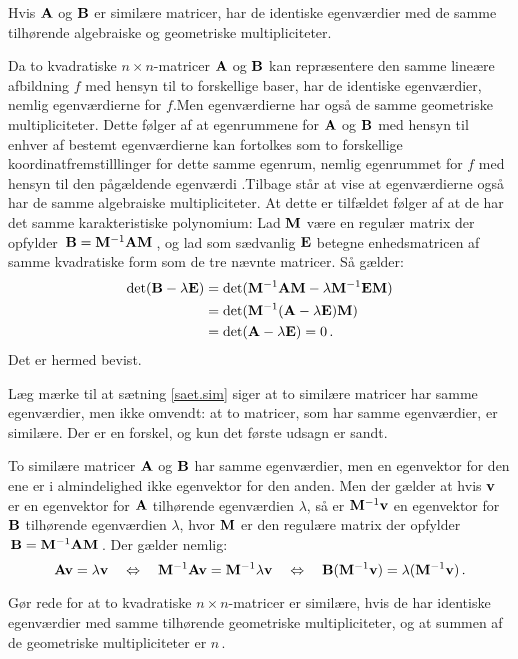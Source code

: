 \begin{theorem} \label{saet.sim}
Hvis $ \mathbf{A} $ og $ \mathbf{B} $ er similære matricer, har de identiske egenværdier med de samme tilhørende algebraiske og geometriske multipliciteter.
\end{theorem}
\begin{bevis}
Da to kvadratiske $n\times n$-matricer $\mathbf{A}$ og $\mathbf{B}$ kan repræsentere den samme lineære afbildning $f$ med hensyn til to forskellige baser, har de identiske egenværdier, nemlig egenværdierne for $f$.\bs Men egenværdierne har også de samme geometriske multipliciteter. Dette følger af at egenrummene for $\mathbf{A}$ og $\mathbf{B}$ med hensyn til enhver af bestemt egenværdierne kan fortolkes som to forskellige koordinatfremstilllinger for dette samme egenrum, nemlig egenrummet for $f$ med hensyn til den pågældende egenværdi .\bs Tilbage står at vise at egenværdierne også har de samme algebraiske multipliciteter. At dette er tilfældet følger af at de har det samme karakteristiske polynomium: Lad $\mathbf{M}$ være en regulær matrix der opfylder $\,\mathbf{B} = \mathbf{M}^{-1} \mathbf{A} \mathbf{M}\,$, og lad som sædvanlig $\mathbf{E}$ betegne enhedsmatricen af samme kvadratiske form som de tre nævnte matricer. Så gælder:
\begin{equation}
\begin{aligned}
\det(\mathbf{B} - \lambda\mathbf{E}) &= \det(\mathbf{M}^{-1} \mathbf{A} \mathbf{M} - \lambda \mathbf{M}^{-1} \mathbf{E} \mathbf{M}) \\
&= \det(\mathbf{M}^{-1}(\mathbf{A} - \lambda\mathbf{E})\mathbf{M}) \\
&= \det(\mathbf{A} - \lambda\mathbf{E}) = 0\,.
\end{aligned}
\end{equation}
Det er hermed bevist.
\end{bevis}

\begin{obs}
Læg mærke til at sætning \ref{saet.sim} siger at to similære matricer har samme egenværdier, men ikke omvendt: at to matricer, som har samme egenværdier, er similære. Der er en forskel, og kun det første udsagn er sandt.
\end{obs}

\begin{obs}
To similære matricer $ \mathbf{A} $ og $ \mathbf{B} $ har samme egenværdier, men en egenvektor for den ene er i almindelighed ikke egenvektor for den anden. Men der gælder at hvis $ \mathbf{v} $ er en egenvektor for $\mathbf{A}$ tilhørende egenværdien $ \lambda $, så er $\mathbf{M}^{-1}\mathbf{v}$ en egenvektor for $\mathbf{B}$ tilhørende egenværdien $ \lambda $, hvor $\mathbf{M}$ er den regulære matrix der opfylder $\,\mathbf{B} = \mathbf{M}^{-1} \mathbf{A} \mathbf{M}\,$. Der gælder nemlig:
\begin{equation}
\mathbf{A}\mathbf{v} = \lambda\mathbf{v} \quad  \Leftrightarrow \quad \mathbf{M}^{-1} \mathbf{A} \mathbf{v} = \mathbf{M}^{-1} \lambda \mathbf{v} \quad \Leftrightarrow \quad \mathbf{B} (\mathbf{M}^{-1} \mathbf{v}) = \lambda (\mathbf{M}^{-1} \mathbf{v}) \,.
\end{equation}
\end{obs}

\begin{exercise}
Gør rede for at to kvadratiske $n\times n$-matricer er similære, hvis de har identiske egenværdier med samme tilhørende geometriske multipliciteter, og at summen af de geometriske multipliciteter er $n\,$. 
\end{exercise}

